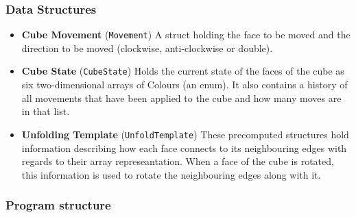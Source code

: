 \documentclass[8pt]{article}
\begin{document}
\subsubsection{Data Structures}

\begin{itemize}

    \item \textbf{Cube Movement} (\texttt{Movement}) A struct holding the face to
    be moved and the direction to be moved (clockwise, anti-clockwise or double).

    \item \textbf{Cube State} (\texttt{CubeState}) Holds the current state of the
    faces of the cube as six two-dimensional arrays of Colours (an enum). It also contains
    a history of all movements that have been applied to the cube and how many moves
    are in that list.

    \item \textbf{Unfolding Template} (\texttt{UnfoldTemplate}) These precomputed
    structures hold information describing how each face connects to its neighbouring
    edges with regards to their array represeantation. When a face of the cube is rotated, this
    information is used to rotate the neighbouring edges along with it.

\end{itemize}

\subsubsection{Program structure}
\end{document}

